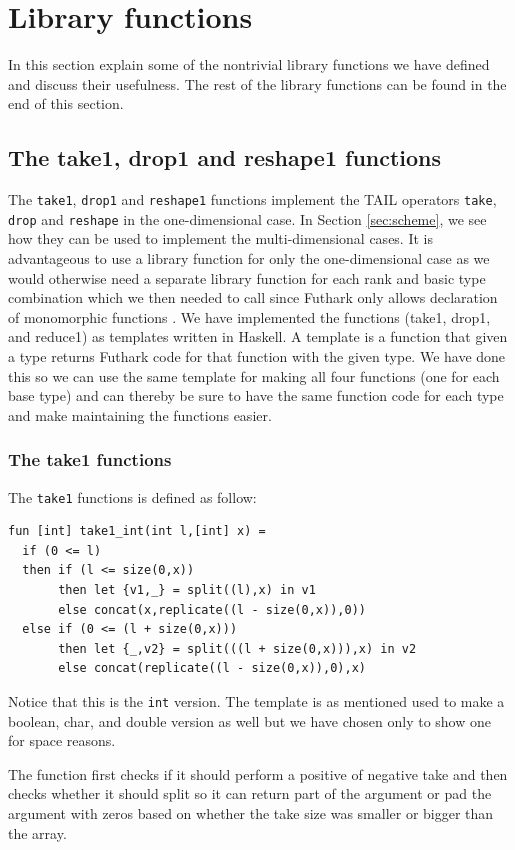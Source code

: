 \documentclass[11pt]{article}
\begin{document}
\section{Library functions}
\label{sec:library}
In this section explain some of the nontrivial library functions we have defined and discuss their usefulness. The rest of the  library functions can be found in the end of this section. 

\subsection{The take1, drop1 and reshape1 functions}
The {\tt take1}, {\tt drop1} and {\tt reshape1} functions implement the TAIL operators {\tt take}, {\tt drop} and {\tt reshape} in the one-dimensional case. In Section \ref{sec:scheme}, we see how they can be used to implement the multi-dimensional cases. It is advantageous to use a library function for only the one-dimensional case as we would otherwise need a separate library function for each 
rank and basic type combination which we then needed to call since Futhark only allows declaration of monomorphic functions \cite{TroelsHenriksen}.
We have implemented the functions (take1, drop1, and reduce1) as templates written in Haskell. 
A template is a function that given a type returns Futhark code for that function with the given type.
We have done this so we can use the same template for making all four functions (one for each base type) and can thereby be sure to have the same function code for each type and make maintaining the functions easier. 

\subsubsection{The take1 functions}
The {\tt take1} functions is defined as follow: 
\begin{lstlisting}[language=Futhark]
fun [int] take1_int(int l,[int] x) =
  if (0 <= l)
  then if (l <= size(0,x))
       then let {v1,_} = split((l),x) in v1
       else concat(x,replicate((l - size(0,x)),0))
  else if (0 <= (l + size(0,x)))
       then let {_,v2} = split(((l + size(0,x))),x) in v2
       else concat(replicate((l - size(0,x)),0),x)
\end{lstlisting}
Notice that this is the {\tt int} version. The template is as mentioned used to make a boolean, char, and double version as well but we have chosen only to show one for space reasons. 

The function first checks if it should perform a positive of negative take and then checks whether it should split so it can return
part of the argument or pad the argument with zeros based on whether the take size was smaller or bigger than the array.
\end{document}

